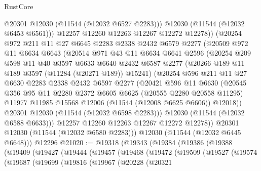 \begin{lexlean}{RustCore}
\begin{coremodule}
              @20301
              @12030
              (@11544 (@12032 @6527 @2283)))
            @12030
            (@11544 (@12032 @6453 @6561)))
          @12257
          @12260
          @12263
          @12267
          @12272
          @12278))
      (@20254
        @972
        @211
        @11
        @27
        @6645
        @2283
        @2338
        @2432
        @6579
        @2277
        (@20509
          @972
          @11
          @6634
          @6643
          (@20514
            @971
            @43
            @11
            @6634
            @6641
            @2596
            (@20254
              @209
              @598
              @11
              @40
              @3597
              @6633
              @6640
              @2432
              @6587
              @2277
              (@20266 @189 @11 @189 @3597 (@11284 (@20271 @189)) @15241)
              (@20254
                @596
                @211
                @11
                @27
                @6630
                @2283
                @2338
                @2432
                @6597
                @2277
                (@20421
                  @596
                  @11
                  @6630
                  (@20545
                    @356
                    @95
                    @11
                    @2280
                    @2372
                    @6605
                    @6625
                    (@20555 @2280 @20558 @11295)
                    @11977
                    @11985
                    @15568
                    @12006
                    (@11544 (@12008 @6625 @6606))
                    @12018))
                @20301
                @12030
                (@11544 (@12032 @6598 @2283)))
              @12030
              (@11544 (@12032 @6588 @6633)))
            @12257
            @12260
            @12263
            @12267
            @12272
            @12278))
        @20301
        @12030
        (@11544 (@12032 @6580 @2283)))
      @12030
      (@11544 (@12032 @6445 @6648)))
    @12296
@21020 := @19318
    (@19343
      (@19384
        (@19386
          (@19388
            (@19409
              (@19427
                (@19444
                  (@19457
                    (@19468
                      (@19472
                        (@19509
                          (@19527
                            (@19574
                              (@19687
                                (@19699
                                  (@19816
                                    (@19967
                                      (@20228
                                        (@20321

\end{coremodule}
\end{lexlean}

